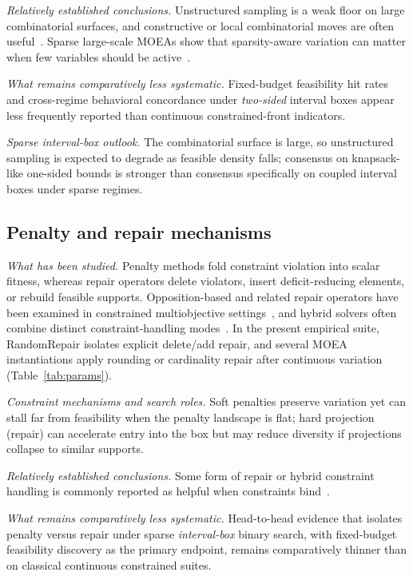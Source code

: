 \documentclass[lettersize,journal]{IEEEtran}
\begin{document}
\emph{Relatively established conclusions.}
Unstructured sampling is a weak floor on large combinatorial surfaces, and constructive or local combinatorial moves are often useful~\cite{li2024empiricalcompari3898,aishwaryaprajna2023evolutionaryande6e82}.
Sparse large-scale MOEAs show that sparsity-aware variation can matter when few variables should be active~\cite{tian2020anevolutionaryalaac9,yang2025asparselargescal6a1f}.

\emph{What remains comparatively less systematic.}
Fixed-budget feasibility hit rates and cross-regime behavioral concordance under \emph{two-sided} interval boxes appear less frequently reported than continuous constrained-front indicators.

\emph{Sparse interval-box outlook.}
The combinatorial surface is large, so unstructured sampling is expected to degrade as feasible density falls; consensus on knapsack-like one-sided bounds is stronger than consensus specifically on coupled interval boxes under sparse regimes.

\subsection{Penalty and repair mechanisms}
\emph{What has been studied.}
Penalty methods fold constraint violation into scalar fitness, whereas repair operators delete violators, insert deficit-reducing elements, or rebuild feasible supports.
Opposition-based and related repair operators have been examined in constrained multiobjective settings~\cite{zhunfan2015anoppositionbasec800}, and hybrid solvers often combine distinct constraint-handling modes~\cite{fukuhara2026ahybriddepsoalgo1602,kan2017aconstrainedmult6073}.
In the present empirical suite, RandomRepair isolates explicit delete/add repair, and several MOEA instantiations apply rounding or cardinality repair after continuous variation (Table~\ref{tab:params}).

\emph{Constraint mechanisms and search roles.}
Soft penalties preserve variation yet can stall far from feasibility when the penalty landscape is flat; hard projection (repair) can accelerate entry into the box but may reduce diversity if projections collapse to similar supports.

\emph{Relatively established conclusions.}
Some form of repair or hybrid constraint handling is commonly reported as helpful when constraints bind~\cite{zhunfan2015anoppositionbasec800,fukuhara2026ahybriddepsoalgo1602}.

\emph{What remains comparatively less systematic.}
Head-to-head evidence that isolates penalty versus repair under sparse \emph{interval-box} binary search, with fixed-budget feasibility discovery as the primary endpoint, remains comparatively thinner than on classical continuous constrained suites.
\end{document}

